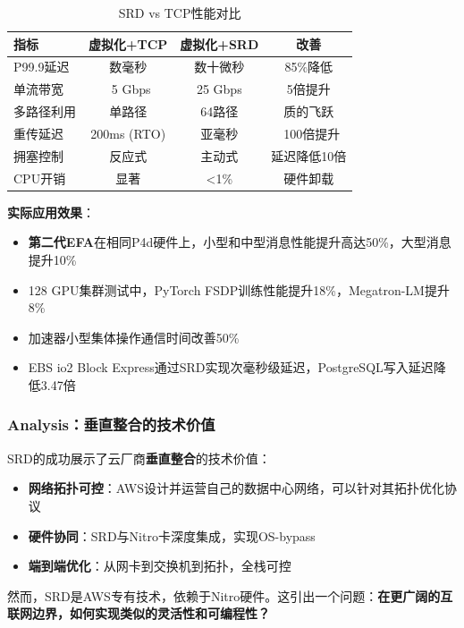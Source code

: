 \begin{table}[h]
\centering
\caption{SRD vs TCP性能对比}
\begin{tabular}{lccc}
\toprule
\textbf{指标} & \textbf{虚拟化+TCP} & \textbf{虚拟化+SRD} & \textbf{改善} \\
\midrule
P99.9延迟 & 数毫秒 & 数十微秒 & 85\%降低 \\
单流带宽 & ~5 Gbps & 25 Gbps & 5倍提升 \\
多路径利用 & 单路径 & 64路径 & 质的飞跃 \\
重传延迟 & 200ms (RTO) & 亚毫秒 & ~100倍提升 \\
拥塞控制 & 反应式 & 主动式 & 延迟降低10倍 \\
CPU开销 & 显著 & <1\% & 硬件卸载 \\
\bottomrule
\end{tabular}
\end{table}

\textbf{实际应用效果}：

\begin{itemize}
    \item \textbf{第二代EFA}在相同P4d硬件上，小型和中型消息性能提升高达50\%，大型消息提升10\%
    \item 128 GPU集群测试中，PyTorch FSDP训练性能提升18\%，Megatron-LM提升8\%
    \item 加速器小型集体操作通信时间改善50\%
    \item EBS io2 Block Express通过SRD实现次毫秒级延迟，PostgreSQL写入延迟降低3.47倍
\end{itemize}

\subsubsection{Analysis：垂直整合的技术价值}

SRD的成功展示了云厂商\textbf{垂直整合}的技术价值：

\begin{itemize}
    \item \textbf{网络拓扑可控}：AWS设计并运营自己的数据中心网络，可以针对其拓扑优化协议
    \item \textbf{硬件协同}：SRD与Nitro卡深度集成，实现OS-bypass
    \item \textbf{端到端优化}：从网卡到交换机到拓扑，全栈可控
\end{itemize}

然而，SRD是AWS专有技术，依赖于Nitro硬件。这引出一个问题：\textbf{在更广阔的互联网边界，如何实现类似的灵活性和可编程性？}


